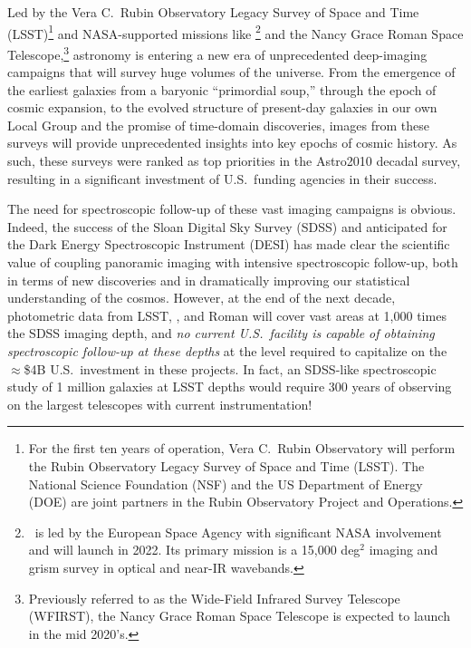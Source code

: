 \documentclass[11pt,a4paper,twoside,onecolumn,openany,final,oldfontcommands]{memoir}
\begin{document}
Led by the Vera C.~Rubin Observatory Legacy Survey of Space and Time (LSST)\footnote{For the first ten years of operation, Vera C.~Rubin Observatory will perform the Rubin Observatory Legacy Survey of Space and Time (LSST). The National Science Foundation (NSF) and the US Department of Energy (DOE) are joint partners in the Rubin Observatory Project and Operations.} and NASA-supported missions like \euclid\footnote{\euclid\ is led by the European Space Agency with significant NASA involvement and will launch in 2022. Its primary mission is a 15,000 deg$^2$ imaging and grism survey in optical and near-IR wavebands.} and the Nancy Grace Roman Space Telescope,\footnote{Previously referred to as the Wide-Field Infrared Survey Telescope (WFIRST), the Nancy Grace Roman Space Telescope is expected to launch in the mid 2020's.} astronomy is entering a new era of unprecedented deep-imaging campaigns that will survey huge volumes of the universe. From the emergence of the earliest galaxies from a baryonic ``primordial soup,'' through the epoch of cosmic expansion, to the evolved structure of present-day galaxies in our own Local Group and the promise of time-domain discoveries, images from these surveys will provide unprecedented insights into key epochs of cosmic history. As such, these surveys were ranked as top priorities in the Astro2010 decadal survey, resulting in a significant investment of U.S.\ funding agencies in their success.

The need for spectroscopic follow-up of these vast imaging campaigns is obvious.  Indeed, the success of the Sloan Digital Sky Survey (SDSS) and anticipated for the Dark Energy Spectroscopic Instrument (DESI) has made clear the scientific value of coupling panoramic imaging with intensive spectroscopic follow-up, both in terms of new discoveries and in dramatically improving our statistical understanding of the cosmos.  However, at the end of the next decade, photometric data from LSST, \euclid, and Roman will cover vast areas at 1,000 times the SDSS imaging depth, and \textit{no current U.S.~facility is capable of obtaining spectroscopic follow-up at these depths} at the level required to capitalize on the $\approx$\$4B U.S.\ investment in these projects. In fact, an SDSS-like spectroscopic study of 1 million galaxies at LSST depths would require 300 years of observing on the largest telescopes with current instrumentation!
\end{document}

